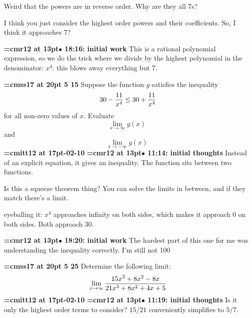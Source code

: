 Weird that the powers are in reverse order. Why are they all 7s?
\par

I think you just consider the highest order powers and their coefficients. So, I think it approaches 7?
\par

{\smallskip\noindent\bf\font\titlefont=cmr12 at 13pt\titlefont $\bullet$ 18:16: initial work}\smallskip
This is a rational polynomial expression, so we do the trick where we divide by the highest polynomial in the denominator: $x^4$. this blows away everything but 7.
\par

{\medskip\noindent\bf\font\titlefont=cmss17 at 20pt 5 15}\medskip
Suppose the function $g$ satisfies the inequality
$$\
30 - {11 \over x^4} \le 30 + {11 \over x^4}
$$
for all non-zero values of $x$. Evaluate
$$\lim_{x \to \infty}{g(x)}$$
and
$$\lim_{x \to -\infty}{g(x)}$$
{\medskip\noindent\bf\font\titlefont=cmitt12 at 17pt-02-10}\medskip
{\smallskip\noindent\bf\font\titlefont=cmr12 at 13pt\titlefont $\bullet$ 11:14: initial thoughts}\smallskip
Instead of an explicit equation, it gives an inequality. The function sits between two functions.
\par

Is this a squeeze theorem thing? You can solve the limits in between, and if they match there's a limit.
\par

eyeballing it: $x^4$ approaches infinity on both sides, which makes it approach 0 on both sides. Both approach 30.
\par

{\smallskip\noindent\bf\font\titlefont=cmr12 at 13pt\titlefont $\bullet$ 18:20: initial work}\smallskip
The hardest part of this one for me was understanding the inequality correctly. I'm still not 100%
\par

{\medskip\noindent\bf\font\titlefont=cmss17 at 20pt 5 25}\medskip
Determine the following limit:
$$\
\lim_{x \to \infty}{
15x^3 + 8x^2 - 8x
\over
21x^3 + 8x^2 + 4x + 5
}
$$
{\medskip\noindent\bf\font\titlefont=cmitt12 at 17pt-02-10}\medskip
{\smallskip\noindent\bf\font\titlefont=cmr12 at 13pt\titlefont $\bullet$ 11:19: initial thoughts}\smallskip
Is it only the highest order terms to consider? $15/21$ conveniently simplifies to $5/7$.
\par

